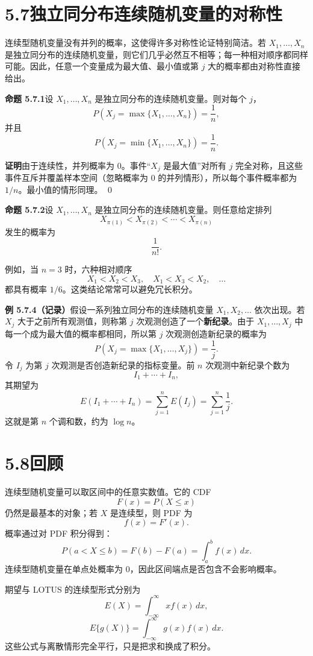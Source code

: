 \documentclass[UTF8, 12pt, fontset=fandol, oneside]{ctexart}
\begin{document}
\section*{5.7\quad 独立同分布连续随机变量的对称性}

连续型随机变量没有并列的概率，这使得许多对称性论证特别简洁。若 $X_1,\ldots,X_n$ 是独立同分布的连续随机变量，则它们几乎必然互不相等；每一种相对顺序都同样可能。因此，任意一个变量成为最大值、最小值或第 $j$ 大的概率都由对称性直接给出。

\noindent\textbf{命题 5.7.1}\quad 设 $X_1,\ldots,X_n$ 是独立同分布的连续随机变量。则对每个 $j$，
\[
  P(X_j=\max\{X_1,\ldots,X_n\})=\frac1n,
\]
并且
\[
  P(X_j=\min\{X_1,\ldots,X_n\})=\frac1n.
\]

\noindent\textbf{证明}\quad 由于连续性，并列概率为 $0$。事件“$X_j$ 是最大值”对所有 $j$ 完全对称，且这些事件互斥并覆盖样本空间（忽略概率为 $0$ 的并列情形），所以每个事件概率都为 $1/n$。最小值的情形同理。
\qed

\noindent\textbf{命题 5.7.2}\quad 设 $X_1,\ldots,X_n$ 是独立同分布的连续随机变量。则任意给定排列
\[
  X_{\pi(1)}<X_{\pi(2)}<\cdots<X_{\pi(n)}
\]
发生的概率为
\[
  \frac1{n!}.
\]

例如，当 $n=3$ 时，六种相对顺序
\[
  X_1<X_2<X_3,\quad X_1<X_3<X_2,\quad \ldots
\]
都具有概率 $1/6$。这类结论常常可以避免冗长积分。

\noindent\textbf{例 5.7.4（记录）}\quad 假设一系列独立同分布的连续随机变量 $X_1,X_2,\ldots$ 依次出现。若 $X_j$ 大于之前所有观测值，则称第 $j$ 次观测创造了一个\textbf{新纪录}。由于 $X_1,\ldots,X_j$ 中每一个成为最大值的概率都相同，所以第 $j$ 次观测创造新纪录的概率为
\[
  P(X_j=\max\{X_1,\ldots,X_j\})=\frac1j.
\]
令 $I_j$ 为第 $j$ 次观测是否创造新纪录的指标变量。前 $n$ 次观测中新纪录个数为
\[
  I_1+\cdots+I_n,
\]
其期望为
\[
  E(I_1+\cdots+I_n)=\sum_{j=1}^nE(I_j)=\sum_{j=1}^n\frac1j.
\]
这就是第 $n$ 个调和数，约为 $\log n$。

\section*{5.8\quad 回顾}

连续型随机变量可以取区间中的任意实数值。它的 CDF
\[
  F(x)=P(X\le x)
\]
仍然是最基本的对象；若 $X$ 是连续型，则 PDF 为
\[
  f(x)=F'(x).
\]
概率通过对 PDF 积分得到：
\[
  P(a<X\le b)=F(b)-F(a)=\int_a^b f(x)\,dx.
\]
连续型随机变量在单点处概率为 $0$，因此区间端点是否包含不会影响概率。

期望与 LOTUS 的连续型形式分别为
\[
  E(X)=\int_{-\infty}^{\infty}x f(x)\,dx,
\]
\[
  E\{g(X)\}=\int_{-\infty}^{\infty}g(x)f(x)\,dx.
\]
这些公式与离散情形完全平行，只是把求和换成了积分。
\end{document}
